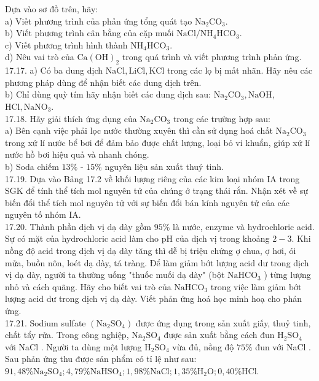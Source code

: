 \documentclass[10pt]{article}
\begin{document}
Dựa vào sơ đồ trên, hãy:\\
a) Viết phương trình của phản ứng tổng quát tạo $\mathrm{Na}_{2} \mathrm{CO}_{3}$.\\
b) Viết phương trình cân bằng của cặp muối $\mathrm{NaCl} / \mathrm{NH}_{4} \mathrm{HCO}_{3}$.\\
c) Viết phương trình hình thành $\mathrm{NH}_{4} \mathrm{HCO}_{3}$.\\
d) Nêu vai trò của $\mathrm{Ca}(\mathrm{OH})_{2}$ trong quá trình và viết phương trình phản ứng.\\
17.17. a) Có ba dung dịch $\mathrm{NaCl}, \mathrm{LiCl}, \mathrm{KCl}$ trong các lọ bị mất nhãn. Hãy nêu các phương pháp dùng để nhận biết các dung dịch trên.\\
b) Chỉ dùng quỳ tím hãy nhận biết các dung dịch sau: $\mathrm{Na}_{2} \mathrm{CO}_{3}, \mathrm{NaOH}$, $\mathrm{HCl}, \mathrm{NaNO}_{3}$.\\
17.18. Hãy giải thích ứng dụng của $\mathrm{Na}_{2} \mathrm{CO}_{3}$ trong các trường hợp sau:\\
a) Bên cạnh việc phải lọc nước thường xuyên thì cần sử dụng hoá chất $\mathrm{Na}_{2} \mathrm{CO}_{3}$ trong xử lí nước bể bơi để đảm bảo được chất lượng, loại bỏ vi khuẩn, giúp xử lí nước hồ bơi hiệu quả và nhanh chóng.\\
b) Soda chiếm $13 \%$ - $15 \%$ nguyên liệu sản xuất thuỷ tinh.\\
17.19. Dựa vào Bảng 17.2 về khối lượng riêng của các kim loại nhóm IA trong SGK để tính thể tích mol nguyên tử của chúng ở trạng thái rắn. Nhận xét về sự biến đổi thể tích mol nguyên tử với sự biến đổi bán kính nguyên tử của các nguyên tố nhóm IA.\\
17.20. Thành phần dịch vị dạ dày gồm $95 \%$ là nước, enzyme và hydrochloric acid. Sự có mặt của hydrochloric acid làm cho pH của dịch vị trong khoảng $2-3$. Khi nồng độ acid trong dịch vị dạ dày tăng thì dễ bị triệu chứng ợ chua, ợ hơi, ói mửa, buồn nôn, loét dạ dày, tá tràng. Để làm giảm bớt lượng acid dư trong dịch vị dạ dày, người ta thường uống "thuốc muối dạ dày" (bột $\mathrm{NaHCO}_{3}$ ) từng lượng nhỏ và cách quãng. Hãy cho biết vai trò của $\mathrm{NaHCO}_{3}$ trong việc làm giảm bớt lượng acid dư trong dịch vị dạ dày. Viết phản ứng hoá học minh hoạ cho phản ứng.\\
17.21. Sodium sulfate $\left(\mathrm{Na}_{2} \mathrm{SO}_{4}\right)$ được ứng dụng trong sản xuất giấy, thuỷ tinh, chất tẩy rửa. Trong công nghiệp, $\mathrm{Na}_{2} \mathrm{SO}_{4}$ được sản xuất bằng cách đun $\mathrm{H}_{2} \mathrm{SO}_{4}$ với NaCl . Người ta dùng một lượng $\mathrm{H}_{2} \mathrm{SO}_{4}$ vừa đủ, nồng độ $75 \%$ đun với NaCl . Sau phản ứng thu được sản phẩm có tỉ lệ như sau: $91,48 \% \mathrm{Na}_{2} \mathrm{SO}_{4} ; 4,79 \% \mathrm{NaHSO}_{4} ; 1,98 \% \mathrm{NaCl} ; 1,35 \% \mathrm{H}_{2} \mathrm{O} ; 0,40 \% \mathrm{HCl}$.\\
\end{document}
